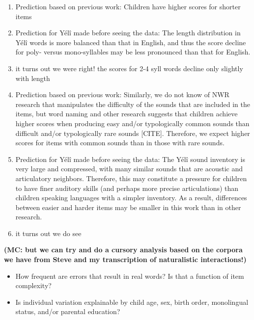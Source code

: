 \documentclass[english,,man,floatsintext]{apa6}
\providecommand{\tightlist}{%
  \setlength{\itemsep}{0pt}\setlength{\parskip}{0pt}}
\begin{document}
\begin{enumerate}
\def\labelenumi{\arabic{enumi}.}
\item
  Prediction based on previous work: Children have higher scores for shorter items
\item
  Prediction for Yélî made before seeing the data: The length distribution in Yélî words is more balanced than that in English, and thus the score decline for poly- versus mono-syllables may be less pronounced than that for English.
\item
  it turns out we were right! the scores for 2-4 syll words decline only slightly with length
\item
  Prediction based on previous work: Similarly, we do not know of NWR research that manipulates the difficulty of the sounds that are included in the items, but word naming and other research suggests that children achieve higher scores when producing easy and/or typologically common sounds than difficult and/or typologically rare sounds {[}CITE{]}. Therefore, we expect higher scores for items with common sounds than in those with rare sounds.
\item
  Prediction for Yélî made before seeing the data: The Yélî sound inventory is very large and compressed, with many similar sounds that are acoustic and articulatory neighbors. Therefore, this may constitute a pressure for children to have finer auditory skills (and perhaps more precise articulations) than children speaking languages with a simpler inventory. As a result, differences between easier and harder items may be smaller in this work than in other research.
\item
  it turns out we do see
\end{enumerate}

\textbf{(MC: but we can try and do a cursory analysis based on the corpora we have from Steve and my transcription of naturalistic interactions!)}

\begin{itemize}
\tightlist
\item
  How frequent are errors that result in real words? Is that a function of item complexity?
\item
  Is individual variation explainable by child age, sex, birth order, monolingual status, and/or parental education?
\end{itemize}
\end{document}
